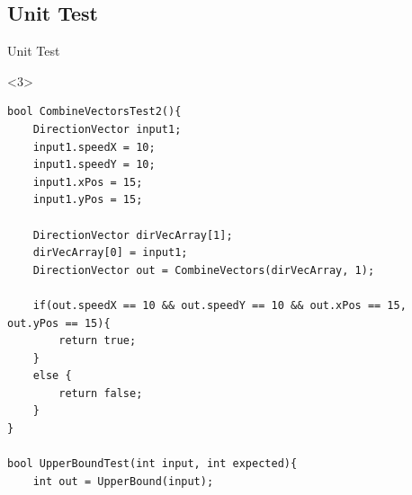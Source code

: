 \subsection{Unit Test}
\begin{frame}[fragile]{Unit Test}
\begin{itemize}
\end{itemize}
\begin{onlyenv}<3>
\begin{center}
\begin{minipage}[H]{0.9\linewidth}
\begin{lstlisting}
bool CombineVectorsTest2(){
	DirectionVector input1;
	input1.speedX = 10;
  	input1.speedY = 10;
  	input1.xPos = 15;
  	input1.yPos = 15;

  	DirectionVector dirVecArray[1];
  	dirVecArray[0] = input1;
  	DirectionVector out = CombineVectors(dirVecArray, 1);

  	if(out.speedX == 10 && out.speedY == 10 && out.xPos == 15, out.yPos == 15){
    	return true;
  	}
  	else {
    	return false;
  	}
}

bool UpperBoundTest(int input, int expected){
	int out = UpperBound(input);


\end{lstlisting}
\end{minipage}
\end{center}
\end{onlyenv}
\end{frame}
